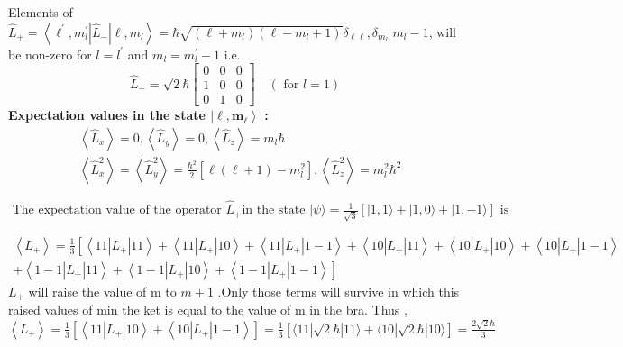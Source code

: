 Elements of $\hat{L}_{+}=\left\langle\ell^{\prime}, m_{l}^{\prime}\left|\hat{L}_{-}\right| \ell, m_{l}\right\rangle=\hbar \sqrt{\left(\ell+m_{l}\right)\left(\ell-m_{l}+1\right)} \delta_{\ell \ell}, \delta_{m_{l},} m_{l}-1$, will be non-zero for $l=l^{\prime}$ and $m_{l}=m_{l}^{\prime}-1$ i.e.
$$
\hat{L}_{-}=\sqrt{2} \hbar\left[\begin{array}{lll}
0 & 0 & 0 \\
1 & 0 & 0 \\
0 & 1 & 0
\end{array}\right] \quad(\text { for } l=1)
$$
\textbf{Expectation values in the state $\left|\ell, \mathbf{m}_{\ell}\right\rangle$ :}
$$
\begin{aligned}
&\left\langle\hat{L}_{x}\right\rangle=0,\left\langle\hat{L}_{y}\right\rangle=0,\left\langle\hat{L}_{z}\right\rangle=m_{l} \hbar \\
&\left\langle\hat{L}_{x}^{2}\right\rangle=\left\langle\hat{L}_{y}^{2}\right\rangle=\frac{\hbar^{2}}{2}\left[\ell(\ell+1)-m_{l}^{2}\right],\left\langle\hat{L}_{z}^{2}\right\rangle=m_{l}^{2} \hbar^{2}
\end{aligned}
$$
\begin{exercise}
	$\text { The expectation value of the operator } \hat{L}_{+} \text {in the state }|\psi\rangle=\frac{1}{\sqrt{3}}[|1,1\rangle+|1,0\rangle+|1,-1\rangle] \text { is }$
\end{exercise}
\begin{answer}
$\begin{gathered}
\left\langle L_{+}\right\rangle=\frac{1}{3}\left[\left\langle 11\left|L_{+}\right| 11\right\rangle+\left\langle 11\left|L_{+}\right| 10\right\rangle+\left\langle 11\left|L_{+}\right| 1-1\right\rangle+\left\langle 10\left|L_{+}\right| 11\right\rangle+\left\langle 10\left|L_{+}\right| 10\right\rangle+\left\langle 10\left|L_{+}\right| 1-1\right\rangle\right. \\
\left.+\left\langle 1-1\left|L_{+}\right| 11\right\rangle+\left\langle 1-1\left|L_{+}\right| 10\right\rangle+\left\langle 1-1\left|L_{+}\right| 1-1\right\rangle\right]
\end{gathered}$
$L_{+}$ will raise the value of m to $m+1$ .Only those terms will survive in which this raised values of min the ket is equal to the value of m in the bra. Thus ,\\
$\left\langle L_{+}\right\rangle=\frac{1}{3}\left[\left\langle 11\left|L_{+}\right| 10\right\rangle+\left\langle 10\left|L_{+}\right| 1-1\right\rangle\right]=\frac{1}{3}[\langle 11|\sqrt{2} \hbar| 11\rangle+\langle 10|\sqrt{2} \hbar| 10\rangle]=\frac{2 \sqrt{2} \hbar}{3}$	
\end{answer}
